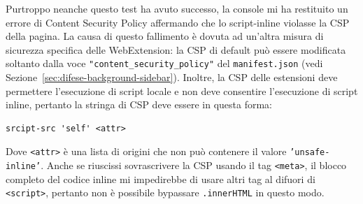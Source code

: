 \documentclass{sapthesis}
\newcommand{\code}[1]{\texttt{#1}}
\newcommand{\attr}[1]{\code{.#1}}
\newcommand{\refSection}[1]{Sezione~\ref{#1}}
\newcommand{\manifest}{\code{manifest.json}}
\newcommand{\tagHTML}[1]{\code{<#1>}}
\newcommand{\meta}{\tagHTML{meta}}
\newcommand{\script}{\tagHTML{script}}
\begin{document}
            Purtroppo neanche questo test ha avuto successo, la console mi ha restituito un errore di Content
            Security Policy affermando che lo script-inline violasse la CSP della pagina. 
            La causa di questo fallimento è dovuta ad un'altra misura di sicurezza specifica delle WebExtension: la CSP
            di default può essere modificata soltanto dalla voce \code{"content\_security\_policy"} del 
            \manifest{} (vedi \refSection{sec:difese-background-sidebar}). 
            Inoltre, la CSP delle estensioni deve permettere l'esecuzione di script locale e non deve consentire
            l'esecuzione di script inline, pertanto la stringa di CSP deve essere in questa forma:
            \begin{lstlisting}[numbers=none]
                srcipt-src 'self' <attr>
            \end{lstlisting}
            Dove \code{<attr>} è una lista di origini che non può contenere il valore \code{'unsafe-inline'}.
            Anche se riuscissi sovrascrivere la CSP usando il tag \meta{}, il blocco completo del codice inline
            mi impedirebbe di usare altri tag al difuori di \script{}, pertanto non è possibile bypassare 
            \attr{innerHTML} in questo modo.
        
        
\end{document}

